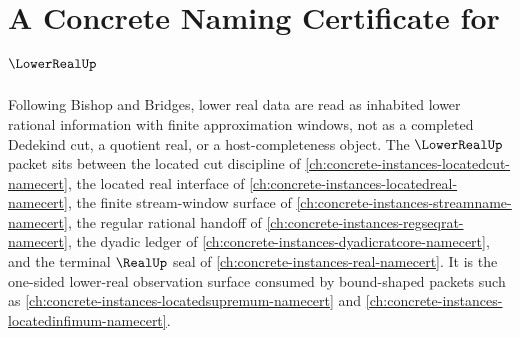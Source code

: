 \chapter{A Concrete Naming Certificate for $\LowerRealUp$}
\label{ch:concrete-instances-lowerreal-namecert}

Following Bishop and Bridges, lower real data are read as inhabited lower rational information with finite approximation windows, not as a completed Dedekind cut, a quotient real, or a host-completeness object. The $\LowerRealUp$ packet sits between the located cut discipline of \autoref{ch:concrete-instances-locatedcut-namecert}, the located real interface of \autoref{ch:concrete-instances-locatedreal-namecert}, the finite stream-window surface of \autoref{ch:concrete-instances-streamname-namecert}, the regular rational handoff of \autoref{ch:concrete-instances-regseqrat-namecert}, the dyadic ledger of \autoref{ch:concrete-instances-dyadicratcore-namecert}, and the terminal $\RealUp$ seal of \autoref{ch:concrete-instances-real-namecert}. It is the one-sided lower-real observation surface consumed by bound-shaped packets such as \autoref{ch:concrete-instances-locatedsupremum-namecert} and \autoref{ch:concrete-instances-locatedinfimum-namecert}.

